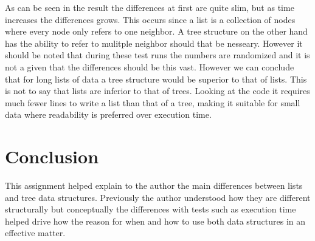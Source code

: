 \documentclass[a4paper,11pt]{article}
\begin{document}
As can be seen in the result the differences at first are quite slim, but as time increases the differences grows. This occurs since a list is a collection of nodes where every node only refers to one neighbor. A tree structure on the other hand has the ability to refer to mulitple neighbor should that be nesseary. However it should be noted that during these test runs the numbers are randomized and it is not a given that the differences should be this vast. However we can conclude that for long lists of data a tree structure would be superior to that of lists.
This is not to say that lists are inferior to that of trees. Looking at the code it requires much fewer lines to write a list than that of a tree, making it suitable for small data where readability is preferred over execution time.  

\section*{Conclusion}

This assignment helped explain to the author the main differences between lists and tree data structures. Previously the author understood how they are different structurally but conceptually the differences with tests such as execution time helped drive how the reason for when and how to use both data structures in an effective matter.
\end{document}
